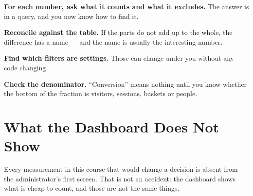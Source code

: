 \begin{conceptbox}
\begin{tightnum}
  \item \textbf{For each number, ask what it counts and what it excludes.} The
        answer is in a query, and you now know how to find it.
  \item \textbf{Reconcile against the table.} If the parts do not add up to the
        whole, the difference has a name --- and the name is usually the
        interesting number.
  \item \textbf{Find which filters are settings.} Those can change under you
        without any code changing.
  \item \textbf{Check the denominator.} ``Conversion'' means nothing until you
        know whether the bottom of the fraction is visitors, sessions, baskets
        or people.
\end{tightnum}
\end{conceptbox}

\section{What the Dashboard Does Not Show}

Every measurement in this course that would change a decision is absent from
the administrator's first screen. That is not an accident: the dashboard shows
what is cheap to count, and those are not the same things.

